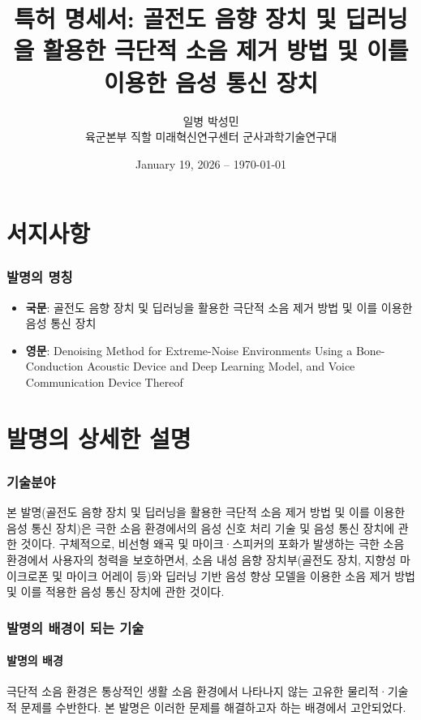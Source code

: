 \documentclass{article}
\title{특허 명세서: 골전도 음향 장치 및 딥러닝을 활용한 극단적 소음 제거 방법 및 이를 이용한 음성 통신 장치}
\author{일병 박성민 \\ 육군본부 직할 미래혁신연구센터 군사과학기술연구대}
\date{January 19, 2026 -- \today}
\begin{document}
\maketitle
\tableofcontents





\newpage
\part{서지사항}
\section{발명의 명칭}
\begin{itemize}
    \item \textbf{국문}: 골전도 음향 장치 및 딥러닝을 활용한 극단적 소음 제거 방법 및 이를 이용한 음성 통신 장치
    \item \textbf{영문}: Denoising Method for Extreme-Noise Environments Using a Bone-Conduction Acoustic Device and Deep Learning Model, and Voice Communication Device Thereof
\end{itemize}






\part{발명의 상세한 설명}


\section{기술분야}

본 발명(골전도 음향 장치 및 딥러닝을 활용한 극단적 소음 제거 방법 및 이를 이용한 음성 통신 장치)은 극한 소음 환경에서의 음성 신호 처리 기술 및 음성 통신 장치에 관한 것이다.
구체적으로, 비선형 왜곡 및 마이크·스피커의 포화가 발생하는 극한 소음 환경에서 사용자의 청력을 보호하면서, 소음 내성 음향 장치부(골전도 장치, 지향성 마이크로폰 및 마이크 어레이 등)와 딥러닝 기반 음성 향상 모델을 이용한 소음 제거 방법 및 이를 적용한 음성 통신 장치에 관한 것이다.

\section{발명의 배경이 되는 기술}

\subsection{발명의 배경}
극단적 소음 환경은 통상적인 생활 소음 환경에서 나타나지 않는 고유한 물리적·기술적 문제를 수반한다.
본 발명은 이러한 문제를 해결하고자 하는 배경에서 고안되었다.
\end{document}
